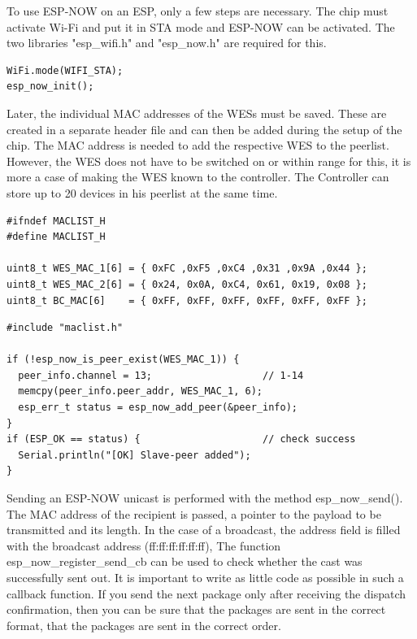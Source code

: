 To use ESP-NOW on an ESP, only a few steps are necessary.
The chip must activate Wi-Fi and put it in STA mode and ESP-NOW can be activated.
The two libraries "esp\_wifi.h" and "esp\_now.h" are required for this.

\begin{lstlisting}[caption=Init ESP-NOW]
WiFi.mode(WIFI_STA);
esp_now_init();
\end{lstlisting}
\label{lst:init}


Later, the individual MAC addresses of the WESs must be saved.
These are created in a separate header file and can then be added during the setup of the chip.
The MAC address is needed to add the respective WES to the peerlist.
However, the WES does not have to be switched on or within range for this, it is more a case of making the WES known to the controller.
The Controller can store up to 20 devices in his peerlist at the same time.

\begin{lstlisting}
#ifndef MACLIST_H
#define MACLIST_H

uint8_t WES_MAC_1[6] = { 0xFC ,0xF5 ,0xC4 ,0x31 ,0x9A ,0x44 };
uint8_t WES_MAC_2[6] = { 0x24, 0x0A, 0xC4, 0x61, 0x19, 0x08 };
uint8_t BC_MAC[6]    = { 0xFF, 0xFF, 0xFF, 0xFF, 0xFF, 0xFF };
\end{lstlisting}
\label{lst:macaddress}

\begin{lstlisting}[caption=Add Peers]
#include "maclist.h"

if (!esp_now_is_peer_exist(WES_MAC_1)) {
  peer_info.channel = 13;                   // 1-14
  memcpy(peer_info.peer_addr, WES_MAC_1, 6);
  esp_err_t status = esp_now_add_peer(&peer_info);
}
if (ESP_OK == status) {                     // check success
  Serial.println("[OK] Slave-peer added"); 
}
\end{lstlisting}

Sending an ESP-NOW unicast is performed with the method esp\_now\_send().
The MAC address of the recipient is passed, a pointer to the payload to be transmitted and its length.
In the case of a broadcast, the address field is filled with the broadcast address (ff:ff:ff:ff:ff:ff),
The function esp\_now\_register\_send\_cb can be used to check whether the cast was successfully sent out.
It is important to write as little code as possible in such a callback function.
If you send the next package only after receiving the dispatch confirmation, then you can be sure that the packages are sent in the correct format,
that the packages are sent in the correct order.

